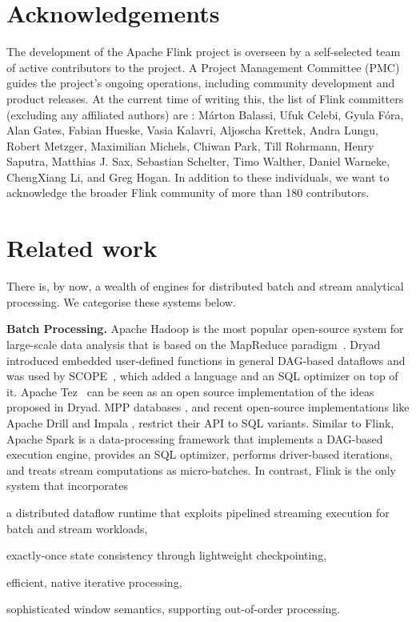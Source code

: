 \documentclass[11pt]{article}
\newcommand{\para}[1]{\vspace{2mm}\noindent\textbf{#1}}
\begin{document}
\vspace{-4mm}
\section{Acknowledgements}
\vspace{-2mm}
\label{sec:acknowledgements}
The development of the Apache Flink project is overseen by a self-selected team of active contributors to the project. A Project Management Committee (PMC) guides the project's ongoing operations, including community development and product releases. At the current time of writing this, the list of Flink committers (excluding any affiliated authors) are : M\'arton Balassi, Ufuk Celebi, Gyula F\'ora, Alan Gates, Fabian Hueske, Vasia Kalavri, Aljoscha Krettek, Andra Lungu, Robert Metzger, Maximilian Michels, Chiwan Park, Till Rohrmann, Henry Saputra, Matthias J. Sax, Sebastian Schelter, Timo Walther, Daniel Warneke, ChengXiang Li, and Greg Hogan. In addition to these individuals, we want to acknowledge the broader Flink community of more than 180 contributors. 

\vspace{-4mm}
\section{Related work}
\vspace{-2mm}
\label{sec:related}
There is, by now, a wealth of engines for distributed batch and stream analytical processing. We categorise these systems below. 

\para{Batch Processing.} Apache Hadoop is the most popular open-source system for large-scale data analysis that is based on the MapReduce paradigm~\cite{DBLP:journals/cacm/DeanG08}. Dryad~\cite{isard2007dryad} introduced embedded user-defined functions in general DAG-based dataflows and was used by SCOPE~\cite{scopeOptimizer}, which added a language and an SQL optimizer on top of it. Apache Tez~\cite{saha2015apache} can be seen as an open source implementation of the ideas proposed in Dryad. MPP databases \cite{dewitt1990gamma}, and recent open-source implementations like Apache Drill and Impala \cite{kornacker2015impala}, restrict their API to SQL variants. Similar to Flink, Apache Spark \cite{DBLP:conf/hotcloud/ZahariaCFSS10} is a data-processing framework that implements a DAG-based execution engine, provides an SQL optimizer, performs driver-based iterations, and treats stream computations as micro-batches. In contrast, Flink is the only system that incorporates
\begin{inparaenum}[i)]
  \item a distributed dataflow runtime that exploits pipelined streaming execution for batch and stream workloads,
  \item exactly-once state consistency through lightweight checkpointing,
  \item efficient, native iterative processing,
  \item sophisticated window semantics, supporting out-of-order processing.
\end{inparaenum}
\end{document}
